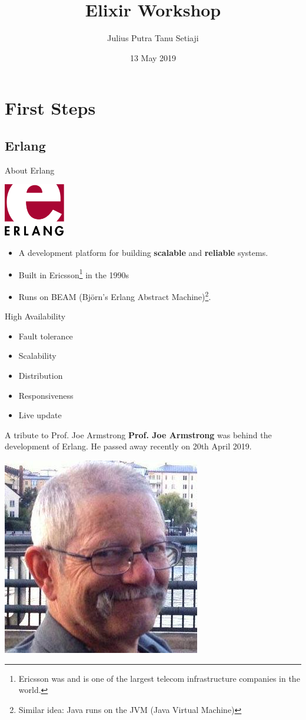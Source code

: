 \documentclass[12pt]{beamer}
\title{Elixir Workshop}
\author{Julius Putra Tanu Setiaji}
\date{13 May 2019}
\begin{document}
\frame[plain]{\titlepage}

\section{First Steps}
\subsection{Erlang}
\begin{frame}{About Erlang}
  \begin{center}
    \includegraphics[width=0.2\textwidth]{erlang}
  \end{center}
  \begin{itemize}
    \item A development platform for building \textbf{scalable} and \textbf{reliable} systems.
    \item Built in Ericsson\footnote{Ericsson was and is one of the largest telecom infrastructure companies in the world.} in the 1990s
    \item Runs on BEAM (Bj\"{o}rn's Erlang Abstract Machine)\footnote{Similar idea: Java runs on the JVM (Java Virtual Machine)}.
  \end{itemize}
\end{frame}


\begin{frame}{High Availability}
  \begin{itemize}
    \item Fault tolerance
    \item Scalability
    \item Distribution
    \item Responsiveness
    \item Live update
  \end{itemize}
\end{frame}

\begin{frame}{A tribute to Prof. Joe Armstrong}
  \textbf{Prof. Joe Armstrong} was behind the development of Erlang. He passed away recently on 20th April 2019.

  \begin{center}
    \includegraphics[width=0.4\linewidth]{joearmstrong}
  \end{center}
\end{frame}
\end{document}
